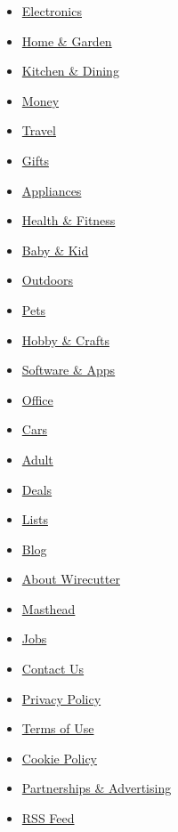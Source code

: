 \begin{itemize}
\tightlist
\item
  \href{/wirecutter/electronics/}{Electronics}
\item
  \href{/wirecutter/home-garden/}{Home \& Garden}
\item
  \href{/wirecutter/kitchen-dining/}{Kitchen \& Dining}
\item
  \href{/wirecutter/money/}{Money}
\item
  \href{/wirecutter/travel/}{Travel}
\item
  \href{/wirecutter/gifts/}{Gifts}
\item
  \href{/wirecutter/appliances/}{Appliances}
\item
  \href{/wirecutter/health-fitness/}{Health \& Fitness}
\item
  \href{/wirecutter/baby-kid/}{Baby \& Kid}
\item
  \href{/wirecutter/outdoors/}{Outdoors}
\item
  \href{/wirecutter/pets/}{Pets}
\item
  \href{/wirecutter/hobby-crafts/}{Hobby \& Crafts}
\item
  \href{/wirecutter/software/}{Software \& Apps}
\item
  \href{/wirecutter/office/}{Office}
\item
  \href{/wirecutter/cars/}{Cars}
\item
  \href{/wirecutter/adult/}{Adult}
\item
  \href{/wirecutter/deals/}{Deals}
\item
  \href{/wirecutter/lists/}{Lists}
\item
  \href{/wirecutter/blog/}{Blog}
\end{itemize}

\begin{itemize}
\tightlist
\item
  \href{/wirecutter/about/}{About Wirecutter}
\item
  \href{/wirecutter/masthead/}{Masthead}
\item
  \href{/wirecutter/jobs/}{Jobs}
\item
  \href{/wirecutter/contact-us/}{Contact Us}
\end{itemize}

\begin{itemize}
\tightlist
\item
  \href{https://www.nytimes.com/subscription/privacy-policy\#/privacy}{Privacy
  Policy}
\item
  \href{https://help.nytimes.com/hc/en-us/articles/115014893428-Terms-of-service}{Terms
  of Use}
\item
  \href{https://www.nytimes.com/subscription/privacy-policy\#/cookie}{Cookie
  Policy}
\item
  \href{/wirecutter/partners/}{Partnerships \& Advertising}
\item
  \href{/wirecutter/feed/}{RSS Feed}
\end{itemize}

